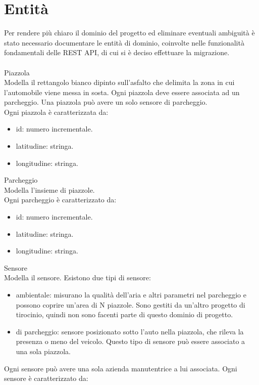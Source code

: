 \section{Entità}
Per rendere più chiaro il dominio del progetto ed eliminare eventuali ambiguità è stato necessario
documentare le entità di dominio, coinvolte nelle funzionalità fondamentali delle REST API, di cui si
è deciso effettuare la migrazione.
\\\\
Piazzola
\\
Modella il rettangolo bianco dipinto sull'asfalto che delimita la zona in cui l'automobile viene messa
in sosta. Ogni piazzola deve essere associata ad un parcheggio. Una piazzola può avere un solo sensore
di parcheggio.
\\
Ogni piazzola è caratterizzata da:
\begin{itemize}
    \item id: numero incrementale.
    \item latitudine: stringa.
    \item longitudine: stringa.
\end{itemize}
\leavevmode\newline
Parcheggio
\\
Modella l'insieme di piazzole.
\\
Ogni parcheggio è caratterizzato da:
\begin{itemize}
    \item id: numero incrementale.
    \item latitudine: stringa.
    \item longitudine: stringa.
\end{itemize}
\leavevmode\newline
Sensore
\\
Modella il sensore. Esistono due tipi di sensore:
\begin{itemize}
    \item ambientale: misurano la qualità dell'aria e altri parametri nel parcheggio e possono 
        coprire un'area di N piazzole.
        Sono gestiti da un'altro progetto di tirocinio, quindi non sono facenti parte di questo dominio di progetto.
    \item di parcheggio: sensore posizionato sotto l'auto nella piazzola, che rileva la presenza o meno
        del veicolo. Questo tipo di sensore può essere associato a una sola piazzola.
\end{itemize}
Ogni sensore può avere una sola azienda manutentrice a lui associata.
Ogni sensore è caratterizzato da:
